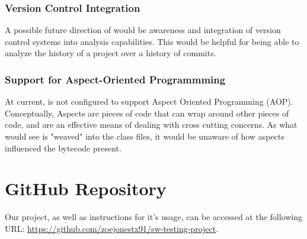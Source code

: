 \subsubsection{Version Control Integration}
A possible future direction of \mt{} would be awareness and integration of version control systems into analysis capabilities. This would be helpful for being able to analyze the history of a project over a history of commits.

\subsubsection{Support for Aspect-Oriented Programmming}

At current, \mt{} is not configured to support Aspect Oriented Programming (AOP). Conceptually, Aspects are pieces of code that can wrap around other pieces of code, and are an effective means of dealing with cross cutting concerns. As what \mt{} would see is "weaved" into the class files, it would be unaware of how aspects influenced the bytecode present.

\section{GitHub Repository}

Our project, as well as instructions for it's usage, can be accessed at the following URL: \url{https://github.com/zoejonestx91/sw-testing-project}.